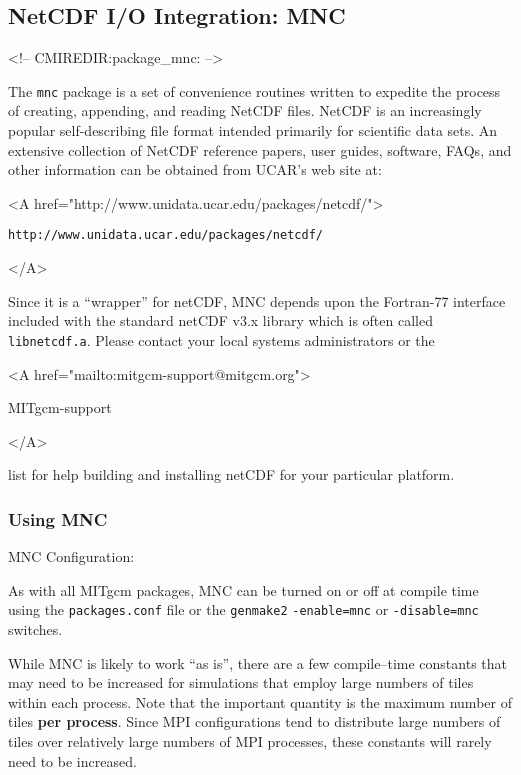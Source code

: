 
\subsection{NetCDF I/O Integration: MNC}
\label{sec:pkg:mnc}
\begin{rawhtml}
<!-- CMIREDIR:package_mnc: -->
\end{rawhtml}

The \texttt{mnc} package is a set of convenience routines written to
expedite the process of creating, appending, and reading NetCDF files.
NetCDF is an increasingly popular self-describing file format
\cite{rew:97} intended primarily for scientific data sets.  An
extensive collection of NetCDF reference papers, user guides,
software, FAQs, and other information can be obtained from UCAR's web
site at:
\begin{rawhtml} <A href="http://www.unidata.ucar.edu/packages/netcdf/"> \end{rawhtml}
\begin{verbatim}
http://www.unidata.ucar.edu/packages/netcdf/
\end{verbatim}
\begin{rawhtml} </A> \end{rawhtml}

Since it is a ``wrapper'' for netCDF, MNC depends upon the Fortran-77
interface included with the standard netCDF v3.x library which is
often called \texttt{libnetcdf.a}.  Please contact your local systems
administrators or the
\begin{rawhtml} <A href="mailto:mitgcm-support@mitgcm.org"> \end{rawhtml}
MITgcm-support
\begin{rawhtml} </A> \end{rawhtml}
list for help building and installing netCDF for your particular
platform.


\subsubsection{Using MNC}

MNC Configuration:

As with all MITgcm packages, MNC can be turned on or off at compile time
using the \texttt{packages.conf} file or the \texttt{genmake2}
\texttt{-enable=mnc} or \texttt{-disable=mnc} switches.

While MNC is likely to work ``as is'', there are a few compile--time
constants that may need to be increased for simulations that employ
large numbers of tiles within each process.  Note that the important
quantity is the maximum number of tiles \textbf{per process}.  Since
MPI configurations tend to distribute large numbers of tiles over
relatively large numbers of MPI processes, these constants will rarely
need to be increased.


